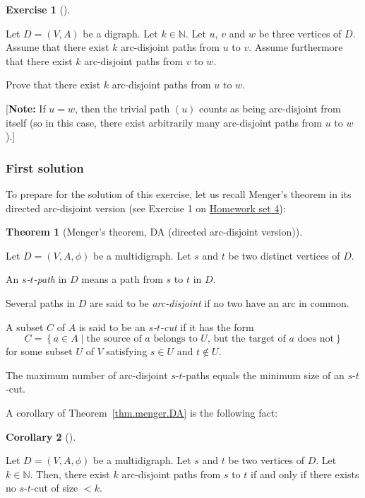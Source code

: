 \documentclass[numbers=enddot,12pt,final,onecolumn,notitlepage]{scrartcl}%
\newcounter{exer}
\theoremstyle{definition}
\newtheorem{theo}{Theorem}[section]
\newenvironment{theorem}[1][]
{\begin{theo}[#1]\begin{leftbar}}
{\end{leftbar}\end{theo}}
\newtheorem{coro}[theo]{Corollary}
\newenvironment{corollary}[1][]
{\begin{coro}[#1]\begin{leftbar}}
{\end{leftbar}\end{coro}}
\newtheorem{exmp}[exer]{Exercise}
\newenvironment{exercise}[1][]
{\begin{exmp}[#1]\begin{leftbar}}
{\end{leftbar}\end{exmp}}
\newcommand{\NN}{\mathbb{N}}
\newcommand{\set}[1]{\left\{ #1 \right\}}
\newcommand{\tup}[1]{\left( #1 \right)}
\begin{document}
\begin{exercise} \label{exe.mt2.menger-postnikov}
Let $D = \tup{V, A}$ be a digraph.
Let $k \in \NN$.
Let $u$, $v$ and $w$ be three vertices of $D$.
Assume that there exist $k$ arc-disjoint paths from $u$ to $v$.
Assume furthermore that there exist $k$ arc-disjoint paths from $v$
to $w$.

Prove that there exist $k$ arc-disjoint paths from $u$ to $w$.

[\textbf{Note:} If $u = w$, then the trivial path $\tup{u}$ counts as
being arc-disjoint from itself (so in this case, there exist
arbitrarily many arc-disjoint paths from $u$ to $w$).]
\end{exercise}

\subsubsection{First solution}

To prepare for the solution of this exercise, let us recall
Menger's theorem in its directed arc-disjoint version
(see Exercise 1 on
\href{http://www-users.math.umn.edu/~dgrinber/5707s17/hw4.pdf}{Homework set 4}):

\begin{theorem}[Menger's theorem, DA (directed arc-disjoint
version)] \label{thm.menger.DA}
Let $D = \tup{V, A, \phi}$ be a multidigraph.
Let $s$ and $t$ be two distinct vertices of $D$.

An \textit{$s$-$t$-path} in $D$ means a path from $s$ to $t$ in $D$.

Several paths in $D$ are said to be
\textit{arc-disjoint} if no two have an arc in common.

A subset $C$ of $A$ is said to be an \textit{$s$-$t$-cut} if it has
the form
\[
C = \set{ a \in A \mid \text{the source of } a \text{ belongs to } U
                        \text{, but the target of } a \text{ does not}
        }
\]
for some subset $U$ of $V$ satisfying $s \in U$ and $t \notin U$.

The maximum number of arc-disjoint $s$-$t$-paths equals
the minimum size of an $s$-$t$-cut.
\end{theorem}

A corollary of Theorem~\ref{thm.menger.DA} is the following fact:

\begin{corollary} \label{cor.menger.DA.1}
Let $D = \tup{V, A, \phi}$ be a multidigraph.
Let $s$ and $t$ be two vertices of $D$.
Let $k \in \NN$.
Then, there exist $k$ arc-disjoint paths from $s$ to $t$ if and only
if there exists no $s$-$t$-cut of size $< k$.
\end{corollary}
\end{document}
